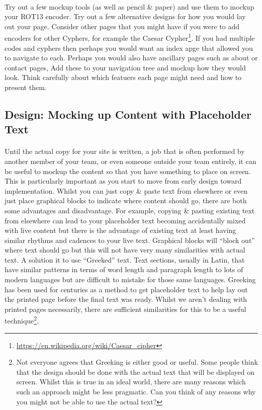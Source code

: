 \documentclass[10pt, a4paper, twosize]{article}
\begin{document}
\paragraph{} Try out a few mockup tools (as well as pencil \& paper) and use them to mockup your ROT13 encoder. Try out a few alternative designs for how you would lay out your page. Consider other pages that you might have if you were to add encoders for other Cyphers, for example the Caesar Cypher\footnote{\url{https://en.wikipedia.org/wiki/Caesar_cipher}}. If you had multiple codes and cyphers then perhaps you would want an index apge that allowed you to navigate to each. Perhaps you would also have ancillary pages such as about or contact pages, Add these to your navigation tree and mockup how they would look. Think carefully about which featuers each page might need and how to present them. 


\subsection{Design: Mocking up Content with Placeholder Text}
\paragraph{} Until the actual copy for your site is written, a job that is often performed by another member of your team, or even someone outside your team entirely, it can be useful to mockup the content so that you have something to place on screen. This is particularly important as you start to move from early design toward implementation. Whilst you can just copy \& paste text from elsewhere or even just place graphical blocks to indicate where content should go, there are both some advantages and disadvantage. For example, copying \& pasting existing text from elsewhere can lead to your placeholder text becoming accidentally mixed with live content but there is the advantage of existing text at least having similar rhythms and cadences to your live text. Graphical blocks will ``block out'' where text should go but this will not have very many similarities with actual text. A solution it to use ``Greeked'' text. Text sections, usually in Latin, that have similar patterns in terms of word length and paragraph length to lots of modern languages but are difficult to mistake for those same languages. Greeking has been used for centuries as a method to get placeholder text to help lay out the printed page before the final text was ready. Whilst we aren't dealing with printed pages necessarily, there are sufficient similarities for this to be a useful technique\footnote{Not everyone agrees that Greeking is either good or useful. Some people think that the design should be done with the actual text that will be displayed on screen. Whilst this is true in an ideal world, there are many reasons which such an approach might be less pragmatic. Can you think of any reasons why you might not be able to use the actual text?}.
\end{document}
